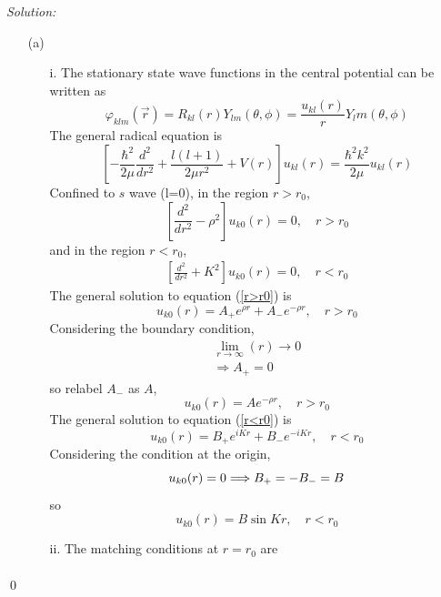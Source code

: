 \documentclass[10pt,a4paper]{article}
\newenvironment{sol}
    {\emph{Solution:}
    }
    {
    \qed
    }
\begin{document}
\begin{sol}
\begin{itemize}
\item[(a)]
\begin{itemize}
\item[i.] The stationary state wave functions in the central potential can be written as
\begin{equation}
\varphi_{klm}(\vec{r})=R_{kl}(r)Y_{lm}(\theta,\phi)=\frac{u_{kl}(r)}{r}Y_lm(\theta,\phi)
\end{equation}
The general radical equation is
\begin{equation}
\left[-\frac{\hbar^2}{2\mu}\frac{d^2}{dr^2}+\frac{l(l+1)}{2\mu r^2}+V(r)\right]u_{kl}(r)=\frac{\hbar^2k^2}{2\mu}u_{kl}(r)
\end{equation}
Confined to $s$ wave (l=0), in the region $r>r_0$,
\begin{equation}
\label{r>r0}
\left[\frac{d^2}{dr^2}-\rho^2\right]u_{k0}(r)=0,\quad r>r_0
\end{equation}
and in the region $r<r_0$,
\begin{gather}
\label{r<r0}
\left[\frac{d^2}{dr^2}+K^2\right]u_{k0}(r)=0,\quad r<r_0
\end{gather}
The general solution to equation (\ref{r>r0}) is
\begin{equation}
u_{k0}(r)=A_+e^{\rho r}+A_-e^{-\rho r},\quad r>r_0
\end{equation}
Considering the boundary condition,
\begin{gather}
\lim_{r\rightarrow\infty}(r)\rightarrow0\\
\Longrightarrow A_+=0
\end{gather}
so relabel $A_-$ as $A$,
\begin{equation}
u_{k0}(r)=Ae^{-\rho r},\quad r>r_0
\end{equation}
The general solution to equation (\ref{r<r0}) is
\begin{equation}
u_{k0}(r)=B_+e^{iKr}+B_-e^{-iKr},\quad r<r_0
\end{equation}
Considering the condition at the origin,
\begin{equation}
u_{k0}(r)=0\\
\Longrightarrow B_+=-B_-=B
\end{equation}
so
\begin{equation}
u_{k0}(r)=B\sin Kr,\quad r<r_0
\end{equation}
\item[ii.] The matching conditions at $r=r_0$ are
\begin{gather}

\end{gather}
\end{itemize}
\end{itemize}
\end{sol}
\end{document}
